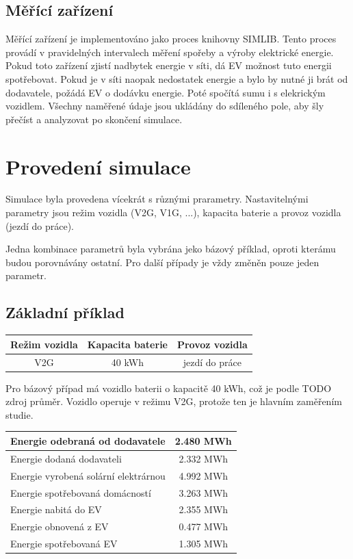 \documentclass[12pt,a4paper]{Cotmas-2018}
\begin{document}
\subsection{Měřící zařízení}
Měřící zařízení je implementováno jako proces knihovny SIMLIB.
Tento proces provádí v pravidelných intervalech měření spořeby a výroby elektrické energie.
Pokud toto zařízení zjistí nadbytek energie v síti, dá EV možnost tuto energii spotřebovat.
Pokud je v síti naopak nedostatek energie a bylo by nutné ji brát od dodavatele, požádá EV o dodávku energie.
Poté spočítá sumu i s elekrickým vozidlem.
Všechny naměřené údaje jsou ukládány do sdíleného pole, aby šly přečíst a analyzovat po skončení simulace.

\section{Provedení simulace}

Simulace byla provedena vícekrát s různými prarametry.
Nastavitelnými parametry jsou režim vozidla (V2G, V1G, ...), kapacita baterie a provoz vozidla (jezdí do práce).

Jedna kombinace parametrů byla vybrána jeko bázový příklad,
oproti kterámu budou porovnávány ostatní.
Pro další případy je vždy změněn pouze jeden parametr.

\subsection{Základní příklad}

\bigskip
\begin{tabular}{ | c | c | c | }
\hline
Režim vozidla & Kapacita baterie & Provoz vozidla \\
\hline
V2G & 40 kWh & jezdí do práce \\
\hline
\end{tabular}
\bigskip

Pro bázový případ má vozidlo baterii o kapacitě 40 kWh, což je podle TODO zdroj průměr.
Vozidlo operuje v režimu V2G, protože ten je hlavním zaměřením studie.

\bigskip
\begin{tabular}{ | l | c | }
\hline
Energie odebraná od dodavatele & 2.480 MWh \\
\hline
Energie dodaná dodavateli & 2.332 MWh \\
\hline
Energie vyrobená solární elektrárnou & 4.992 MWh \\
\hline
Energie spotřebovaná domácností & 3.263 MWh \\
\hline
Energie nabitá do EV & 2.355 MWh \\
\hline
Energie obnovená z EV & 0.477 MWh \\
\hline
Energie spotřebovaná EV & 1.305 MWh \\
\hline
\end{tabular}
\bigskip
\end{document}

